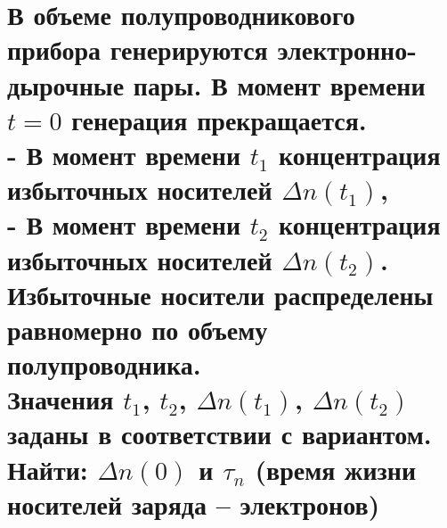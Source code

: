 \documentclass[12pt,a4paper]{article}
\theoremstyle{plain}
\theoremstyle{definition}
\theoremstyle{remark}
\numberwithin{equation}{section}
\begin{document}
\section{\large\textnormal{В объеме полупроводникового прибора генерируются 
электронно-дырочные пары. В момент времени $t = 0$ генерация прекращается. \\
- В момент времени $t_1$ концентрация избыточных носителей $\Delta n(t_1)$, \\
- В момент времени $t_2$ концентрация избыточных носителей $\Delta n(t_2)$. \\
Избыточные носители распределены равномерно по объему полупроводника. \\
Значения $t_1$, $t_2$, $\Delta n(t_1)$, $\Delta n(t_2)$ заданы в соответствии с вариантом. \\
Найти: $\Delta n(0)$ и $\tau_n$ (время жизни носителей заряда – электронов)}}
\end{document}
